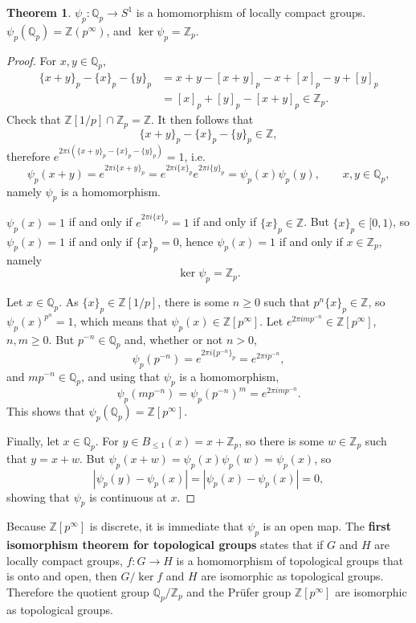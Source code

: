 \documentclass{article}
\theoremstyle{definition}
\newtheorem{theorem}{Theorem}
\theoremstyle{definition}
\begin{document}
\begin{theorem}
$\psi_p:\mathbb{Q}_p \to S^1$ is a  homomorphism of locally compact groups.
$\psi_p(\mathbb{Q}_p) = \mathbb{Z}(p^\infty)$, and $\ker \psi_p = \mathbb{Z}_p$.
\end{theorem}
\begin{proof}
For $x,y \in \mathbb{Q}_p$,
\begin{align*}
\{x+y\}_p - \{x\}_p - \{y\}_p &= x+y - [x+y]_p - x + [x]_p - y + [y]_p\\
&=[x]_p + [y]_p - [x+y]_p \in \mathbb{Z}_p.
\end{align*}
Check that $\mathbb{Z}[1/p] \cap \mathbb{Z}_p = \mathbb{Z}$. It then follows that
\[
\{x+y\}_p - \{x\}_p - \{y\}_p  \in \mathbb{Z},
\]
therefore $e^{2\pi i(\{x+y\}_p - \{x\}_p - \{y\}_p)}=1$, i.e.
\[
\psi_p(x+y) = e^{2\pi i\{x+y\}_p} = e^{2\pi i\{x\}_p} e^{2\pi i\{y\}_p}=\psi_p(x) \psi_p(y),\qquad x,y \in \mathbb{Q}_p,
\]
namely $\psi_p$ is a homomorphism.

$\psi_p(x)=1$ if and only if $e^{2\pi i\{x\}_p}=1$ if and only if $\{x\}_p \in \mathbb{Z}$. But
$\{x\}_p \in [0,1)$, so $\psi_p(x)=1$ if and only if $\{x\}_p=0$, hence
$\psi_p(x)=1$ if and only if $x \in \mathbb{Z}_p$, namely
\[
\ker \psi_p = \mathbb{Z}_p.
\]

Let $x \in \mathbb{Q}_p$. 
As $\{x\}_p \in \mathbb{Z}[1/p]$, there is some $n \geq 0$ such that $p^n \{x\}_p \in \mathbb{Z}$, so
$\psi_p(x)^{p^n} = 1$, which means that $\psi_p(x) \in \mathbb{Z}[p^\infty]$. 
Let $e^{2\pi imp^{-n}} \in \mathbb{Z}[p^\infty]$, $n,m \geq 0$. 
But $p^{-n} \in \mathbb{Q}_p$ and, whether or not $n >0$,
\[
\psi_p(p^{-n}) = e^{2\pi i\{p^{-n}\}_p} = e^{2\pi ip^{-n}},
\]
and $m p^{-n} \in \mathbb{Q}_p$, and using that $\psi_p$ is a homomorphism,
\[
\psi_p(mp^{-n}) = \psi_p(p^{-n})^m = e^{2\pi imp^{-n}}.
\]
This shows that $\psi_p(\mathbb{Q}_p) = \mathbb{Z}[p^\infty]$.

Finally, let $x \in \mathbb{Q}_p$. For $y \in B_{\leq 1}(x) = x+\mathbb{Z}_p$, 
so there is some $w \in \mathbb{Z}_p$ such that $y=x+w$. But $\psi_p(x+w)
=\psi_p(x) \psi_p(w)=\psi_p(x)$, so
\[
|\psi_p(y)-\psi_p(x)| = |\psi_p(x)-\psi_p(x)|=0,
\]
showing that $\psi_p$ is continuous at $x$. 
\end{proof}

Because $\mathbb{Z}[p^\infty]$ is discrete, it is immediate that $\psi_p$ is an open map.
The \textbf{first isomorphism theorem for topological groups} states that if
$G$ and $H$ are locally compact groups, $f:G \to H$ is a homomorphism of topological groups that is
onto and open, then $G/\ker f$ and $H$ are isomorphic as topological groups. 
Therefore the quotient group $\mathbb{Q}_p / \mathbb{Z}_p$ and the Pr\"ufer group $\mathbb{Z}[p^\infty]$
are isomorphic as topological groups.
\end{document}
